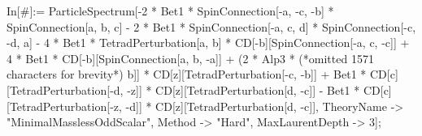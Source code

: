 In[#]:= ParticleSpectrum[-2 * Bet1 * SpinConnection[-a, -c, -b] * SpinConnection[a, b, c] - 2 * Bet1 * SpinConnection[-a, c, d] * SpinConnection[-c, -d, a] - 4 * Bet1 * TetradPerturbation[a, b] * CD[-b][SpinConnection[-a, c, -c]] + 4 * Bet1 * CD[-b][SpinConnection[a, b, -a]] + (2 * Alp3 * (*omitted 1571 characters for brevity*) b]] * CD[z][TetradPerturbation[-c, -b]] + Bet1 * CD[c][TetradPerturbation[-d, -z]] * CD[z][TetradPerturbation[d, -c]] - Bet1 * CD[c][TetradPerturbation[-z, -d]] * CD[z][TetradPerturbation[d, -c]], TheoryName -> "MinimalMasslessOddScalar", Method -> "Hard", MaxLaurentDepth -> 3];